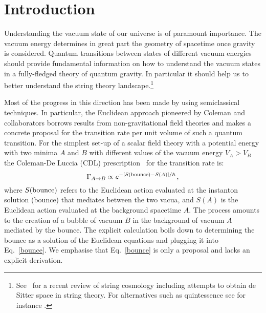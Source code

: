 \documentclass[a4paper,11pt]{article}
\numberwithin{equation}{section}
\newcommand{\be}{\begin{equation}}
\newcommand{\ee}{\end{equation}}
\numberwithin{equation}{section}
\begin{document}
\tableofcontents


\renewcommand*{\thefootnote}{\arabic{footnote}}
\setcounter{footnote}{0}

\newpage




\section{Introduction}

Understanding the vacuum state of our universe is of paramount importance. The vacuum energy determines in great part the geometry of spacetime once gravity is considered. Quantum transitions between states of different vacuum energies should provide fundamental information on how to understand the vacuum states in a fully-fledged theory of quantum gravity. In particular it should help us to better understand the string theory landscape.\footnote{See~\cite{Cicoli:2023opf} for a recent review of string cosmology including attempts to  obtain de Sitter space in string theory. For alternatives such as quintessence see for instance \cite{Cicoli:2018kdo, Hebecker:2019csg, Cicoli:2021fsd}.} 
\vskip 1mm

Most of the progress in this direction has been made by using  semiclassical techniques.
In particular, the Euclidean approach pioneered by Coleman and collaborators \cite{Coleman:1980aw} borrows results from non-gravitational field theories  \cite{Coleman:1977py, Callan:1977pt} and makes a concrete proposal for the transition rate per unit volume of such a quantum transition. For the simplest set-up of a scalar field theory with a potential energy with two minima $A$ and $B$ with different values of the vacuum energy $V_A > V_B$  the Coleman-De Luccia (CDL) prescription~\cite{Coleman:1980aw} for the transition rate is:
\be
\Gamma_{A\rightarrow B} \propto e^{-\left[S({\rm bounce})- S(A)\right]/\hbar} \,, \label{bounce}
\ee
where $ S({\rm bounce})$ refers to the Euclidean action evaluated at the instanton solution (bounce) that mediates between the two vacua, and $S(A)$ is the Euclidean action evaluated at the background spacetime $A$. The process amounts to the creation of a bubble of vacuum $B$ in the background of vacuum $A$ mediated by the bounce. The explicit calculation boils down to determining the bounce as a solution of the Euclidean equations and plugging it into Eq.~\eqref{bounce}. We emphasise that Eq.~\eqref{bounce} is only a proposal and lacks an explicit derivation.
\vskip 1mm
\end{document}
